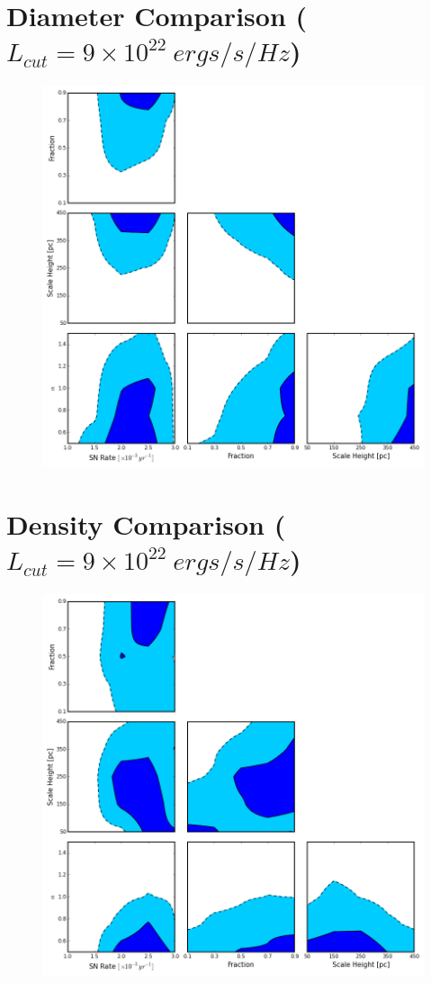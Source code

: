 \documentclass[10pt,a4paper]{article}
\begin{document}
\section* {Diameter Comparison ($L_{cut} = 9 \times 10^{22}\ ergs/s/Hz$)}
\begin{figure}[h!]
\includegraphics[width=15cm]{TrianglePlot_diams2.png}
\caption{}
\end{figure}
\newpage
\section* {Density Comparison ($L_{cut} = 9 \times 10^{22}\ ergs/s/Hz$)}
\begin{figure}[h!]
\includegraphics[width=15cm]{TrianglePlot_dens2.png}
\caption{}
\end{figure}
\end{document}
